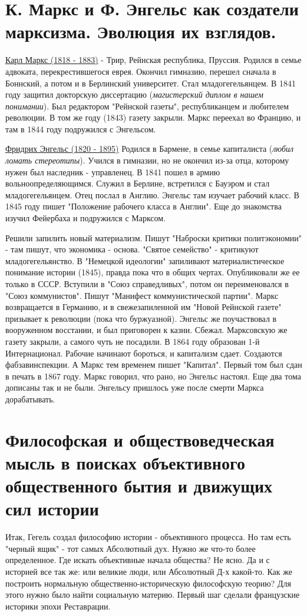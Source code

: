 \section{К. Маркс и Ф. Энгельс как создатели марксизма. Эволюция их взглядов.}
\underline{Карл Маркс (1818 - 1883)} - Трир, Рейнская республика, Пруссия. Родился в семье адвоката, перекрестившегося еврея. Окончил гимназию, перешел сначала в Боннский, а потом и в Берлинский университет. Стал младогегельянцем. В 1841 году защитил докторскую диссертацию (\textit{магистерский диплом в нашем понимании}). Был редактором "Рейнской газеты", республиканцем и любителем революции. В том же году (1843) газету закрыли. Маркс переехал во Францию, и там в 1844 году подружился с Энгельсом.
 
\underline{Фридрих Энгельс (1820 - 1895)} Родился в Бармене, в семье капиталиста (\textit{любил ломать стереотипы}). Учился в гимназии, но не окончил из-за отца, которому нужен был наследник - управленец. В 1841 пошел в армию вольноопределяющимся. Служил в Берлине, встретился с Бауэром и стал младогегельянцем. Отец послал в Англию. Энгельс там изучает рабочий класс. В 1845 году пишет "Положение рабочего класса в Англии". Еще до знакомства изучил Фейербаха и подружился с Марксом. 

Решили запилить новый материализм. Пишут "Наброски критики политэкономии" - там пишут, что экономика - основа. "Святое семейство" - критикуют младогегельянство. В "Немецкой идеологии" запиливают материалистическое понимание истории (1845), правда пока что в общих чертах. Опубликовали же ее только в СССР. Вступили в "Союз справедливых", потом он переименовался в "Союз коммунистов". Пишут "Манифест коммунистической партии". Маркс возвращается в Германию, и в свежезапиленной им "Новой Рейнской газете" призывает к революции (пока что буржуазной). Энгельс же поучаствовал в вооруженном восстании, и был приговорен к казни. Сбежал. Марксовскую же газету закрыли, а самого чуть не посадили. В 1864  году образован 1-й Интернационал. Рабочие начинают бороться, и капитализм сдает. Создаются фабзавинспекции. А Маркс тем временем пишет "Капитал". Первый том был сдан в печать в 1867 году. Маркс говорил, что рано, но Энгельс настоял. Еще два тома дописаны так и не были. Энгельсу пришлось уже после смерти Маркса дорабатывать.

\section{Философская и обществоведческая мысль в поисках объективного общественного бытия и движущих сил истории}
Итак, Гегель создал философию истории - объективного процесса. Но там есть "черный ящик" - тот самых Абсолютный дух. Нужно же что-то более определенное.  Где искать объективные начала общества? Не ясно. Да и с историей все так же: или великие люди, или Абсолютный Д-х какой-то. Как же построить нормальную общественно-историческую философскую теорию? Для этого нужно было найти социальную материю. Первый шаг сделали французские историки эпохи Реставрации.

